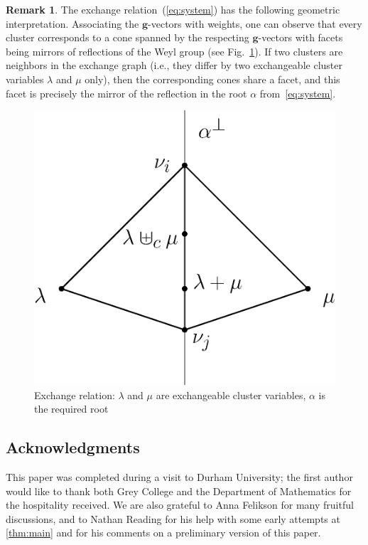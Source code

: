 \documentclass[11pt]{amsart}
\newcommand{\bg}{\mathbf{g}}
\theoremstyle{definition}
\newtheorem{remark}[theorem]{Remark}
\numberwithin{equation}{section}
\numberwithin{figure}{section}
\begin{document}
\begin{remark}
\label{geom}
\say[PT]{}
The exchange relation~(\ref{eq:system}) has the following geometric interpretation. Associating the $\bg$-vectors with weights, one can observe that every cluster corresponds to a cone spanned by the respecting $\bg$-vectors with facets being mirrors of reflections of the Weyl group (see Fig.~\ref{fig:exchange_relation}). If two clusters are neighbors in the exchange graph (i.e., they differ by two exchangeable cluster variables $\lambda$ and $\mu$ only), then the corresponding cones share a facet, and this facet is precisely the mirror of the reflection in the root $\alpha$ from~\cref{eq:system}.    

 \begin{figure}[h]
    \begin{center}
      \includegraphics[scale=0.4]{cones-section.eps}
    \end{center}
    \caption{Exchange relation: $\lambda$ and $\mu$ are exchangeable cluster variables, $\alpha$ is the required root}
    \label{fig:exchange_relation}
  \end{figure}

\end{remark} 
 
\subsection*{Acknowledgments}
  This paper was completed during a visit to Durham University; the first author would like to thank both Grey College and the Department of Mathematics for the hospitality received.
  We are also grateful to Anna Felikson for many fruitful discussions, and to Nathan Reading for his help with some early attempts at \cref{thm:main} and for his comments on a preliminary version of this paper.
 
\end{document}

